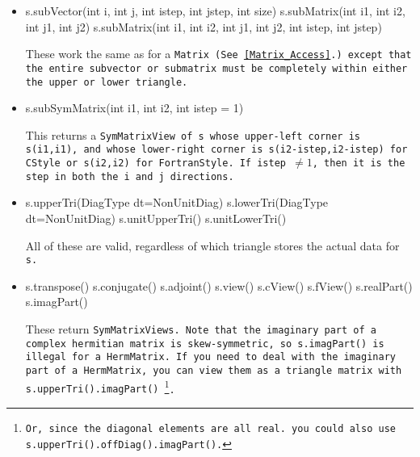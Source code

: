 \begin{itemize}
\item
\begin{tmvcode}
s.subVector(int i, int j, int istep, int jstep, int size)
s.subMatrix(int i1, int i2, int j1, int j2)
s.subMatrix(int i1, int i2, int j1, int j2, int istep, int jstep)
\end{tmvcode}
These work the same as for a \tt{Matrix}
(See \ref{Matrix_Access}.)
except that the entire
subvector or submatrix must be completely within either the upper or lower triangle.

\item
\begin{tmvcode}
s.subSymMatrix(int i1, int i2, int istep = 1)
\end{tmvcode}
This returns a \tt{SymMatrixView} of \tt{s} whose upper-left
corner is \tt{s(i1,i1)}, and whose lower-right corner is 
\tt{s(i2-istep,i2-istep)} for \tt{CStyle} or \tt{s(i2,i2)} for \tt{FortranStyle}.  If \tt{istep} $\neq 1$, then it is the 
step in both the \tt{i} and \tt{j} directions.

\item
\begin{tmvcode}
s.upperTri(DiagType dt=NonUnitDiag)
s.lowerTri(DiagType dt=NonUnitDiag)
s.unitUpperTri()
s.unitLowerTri()
\end{tmvcode}
All of these are valid, regardless
of which triangle stores the actual data for \tt{s}.

\item
\begin{tmvcode}
s.transpose()
s.conjugate()
s.adjoint()
s.view()
s.cView()
s.fView()
s.realPart()
s.imagPart()
\end{tmvcode}
These return \tt{SymMatrixView}s.
Note that the imaginary part of a complex hermitian matrix is skew-symmetric,
so \tt{s.imagPart()} is illegal for a \tt{HermMatrix}.  If you need to
deal with the imaginary part of a \tt{HermMatrix},
you can view them as a triangle matrix with \tt{s.upperTri().imagPart()}
\footnote{Or, 
since the diagonal elements are all real.
you could also use \tt{s.upperTri().offDiag().imagPart()}.}.

\end{itemize}

